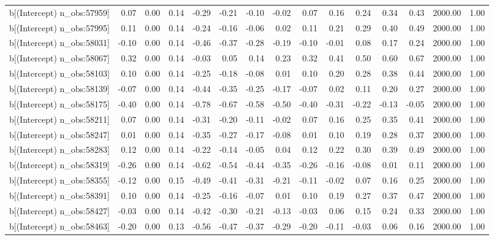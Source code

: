 \begin{table}[ht]
\begin{tabular}{rrrrrrrrrrrrrrr}
  b[(Intercept) n\_obs:57959] & 0.07 & 0.00 & 0.14 & -0.29 & -0.21 & -0.10 & -0.02 & 0.07 & 0.16 & 0.24 & 0.34 & 0.43 & 2000.00 & 1.00 \\ 
  b[(Intercept) n\_obs:57995] & 0.11 & 0.00 & 0.14 & -0.24 & -0.16 & -0.06 & 0.02 & 0.11 & 0.21 & 0.29 & 0.40 & 0.49 & 2000.00 & 1.00 \\ 
  b[(Intercept) n\_obs:58031] & -0.10 & 0.00 & 0.14 & -0.46 & -0.37 & -0.28 & -0.19 & -0.10 & -0.01 & 0.08 & 0.17 & 0.24 & 2000.00 & 1.00 \\ 
  b[(Intercept) n\_obs:58067] & 0.32 & 0.00 & 0.14 & -0.03 & 0.05 & 0.14 & 0.23 & 0.32 & 0.41 & 0.50 & 0.60 & 0.67 & 2000.00 & 1.00 \\ 
  b[(Intercept) n\_obs:58103] & 0.10 & 0.00 & 0.14 & -0.25 & -0.18 & -0.08 & 0.01 & 0.10 & 0.20 & 0.28 & 0.38 & 0.44 & 2000.00 & 1.00 \\ 
  b[(Intercept) n\_obs:58139] & -0.07 & 0.00 & 0.14 & -0.44 & -0.35 & -0.25 & -0.17 & -0.07 & 0.02 & 0.11 & 0.20 & 0.27 & 2000.00 & 1.00 \\ 
  b[(Intercept) n\_obs:58175] & -0.40 & 0.00 & 0.14 & -0.78 & -0.67 & -0.58 & -0.50 & -0.40 & -0.31 & -0.22 & -0.13 & -0.05 & 2000.00 & 1.00 \\ 
  b[(Intercept) n\_obs:58211] & 0.07 & 0.00 & 0.14 & -0.31 & -0.20 & -0.11 & -0.02 & 0.07 & 0.16 & 0.25 & 0.35 & 0.41 & 2000.00 & 1.00 \\ 
  b[(Intercept) n\_obs:58247] & 0.01 & 0.00 & 0.14 & -0.35 & -0.27 & -0.17 & -0.08 & 0.01 & 0.10 & 0.19 & 0.28 & 0.37 & 2000.00 & 1.00 \\ 
  b[(Intercept) n\_obs:58283] & 0.12 & 0.00 & 0.14 & -0.22 & -0.14 & -0.05 & 0.04 & 0.12 & 0.22 & 0.30 & 0.39 & 0.49 & 2000.00 & 1.00 \\ 
  b[(Intercept) n\_obs:58319] & -0.26 & 0.00 & 0.14 & -0.62 & -0.54 & -0.44 & -0.35 & -0.26 & -0.16 & -0.08 & 0.01 & 0.11 & 2000.00 & 1.00 \\ 
  b[(Intercept) n\_obs:58355] & -0.12 & 0.00 & 0.15 & -0.49 & -0.41 & -0.31 & -0.21 & -0.11 & -0.02 & 0.07 & 0.16 & 0.25 & 2000.00 & 1.00 \\ 
  b[(Intercept) n\_obs:58391] & 0.10 & 0.00 & 0.14 & -0.25 & -0.16 & -0.07 & 0.01 & 0.10 & 0.19 & 0.27 & 0.37 & 0.47 & 2000.00 & 1.00 \\ 
  b[(Intercept) n\_obs:58427] & -0.03 & 0.00 & 0.14 & -0.42 & -0.30 & -0.21 & -0.13 & -0.03 & 0.06 & 0.15 & 0.24 & 0.33 & 2000.00 & 1.00 \\ 
  b[(Intercept) n\_obs:58463] & -0.20 & 0.00 & 0.13 & -0.56 & -0.47 & -0.37 & -0.29 & -0.20 & -0.11 & -0.03 & 0.06 & 0.16 & 2000.00 & 1.00 \\ 

\end{tabular}
\end{table}
